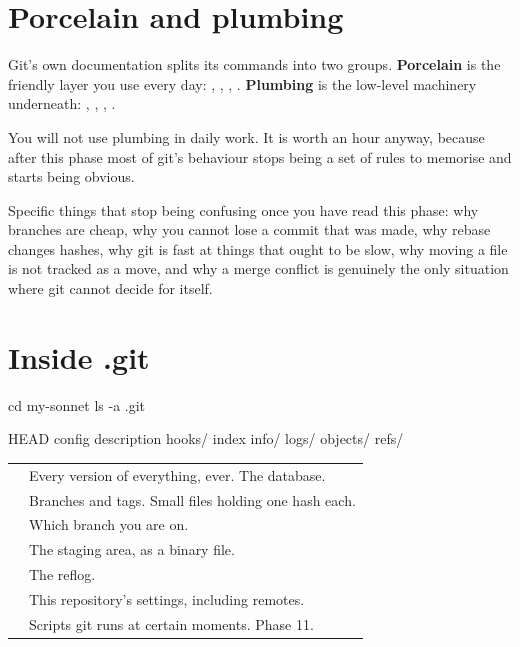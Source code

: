 \documentclass[11pt]{article}
\begin{document}
\maketitlepage

\section{Porcelain and plumbing}

Git's own documentation splits its commands into two groups. \textbf{Porcelain} is
the friendly layer you use every day: , , , .
\textbf{Plumbing} is the low-level machinery underneath: ,
, , .

You will not use plumbing in daily work. It is worth an hour anyway, because after
this phase most of git's behaviour stops being a set of rules to memorise and starts
being obvious.

\begin{why}
Specific things that stop being confusing once you have read this phase: why
branches are cheap, why you cannot lose a commit that was made, why rebase changes
hashes, why git is fast at things that ought to be slow, why moving a file is not
tracked as a move, and why a merge conflict is genuinely the only situation where
git cannot decide for itself.
\end{why}

\section{Inside .git}

\begin{shell}
cd my-sonnet
ls -a .git
\end{shell}

\begin{terminal}
HEAD          config       description    hooks/
index         info/        logs/          objects/
refs/
\end{terminal}

\vspace{0.5em}
\begin{tabularx}{\linewidth}{@{}L{2.6cm} X@{}}
\toprule
{} &  \\
\midrule
{} & Every version of everything, ever. The database. \\
 & Branches and tags. Small files holding one hash each. \\
 & Which branch you are on. \\
 & The staging area, as a binary file. \\
 & The reflog. \\
 & This repository's settings, including remotes. \\
 & Scripts git runs at certain moments. Phase 11. \\
\bottomrule
\end{tabularx}
\vspace{0.5em}
\end{document}
